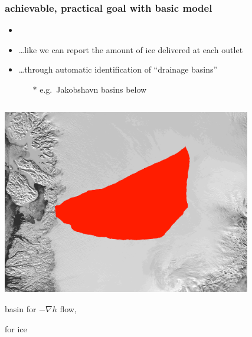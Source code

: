 \documentclass[hide notes,intlimits]{beamer}
\begin{document}
\begin{frame}
  \frametitle{achievable, practical goal with basic model}
 
\begin{itemize}
\item  {}
\item \dots like we can report the amount of ice delivered at each outlet
\item \dots through automatic identification of ``drainage basins''
  \begin{itemize}
  \item[$\ast$] e.g.~Jakobshavn basins below
  \end{itemize}
\end{itemize}

\vspace{-5mm}

\begin{columns}
\begin{column}{0.5\textwidth}
\begin{center}
\includegraphics[width=0.85\textwidth]{figs/ftt-mask}

basin for $-\nabla h$ flow,

\phantom{where $\phi$}

for ice
\end{center}
\end{column}
\begin{column}{0.5\textwidth}
\begin{center}
\vspace{0.5mm}


\end{center}
\end{column}
\end{columns}
\end{frame}
\end{document}
